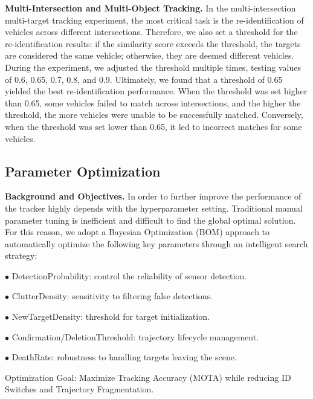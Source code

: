 \documentclass[lettersize,journal]{IEEEtran}
\begin{document}
\textbf{Multi-Intersection and Multi-Object Tracking.}
In the multi-intersection multi-target tracking experiment, the most critical task is the re-identification of vehicles across different intersections. 
Therefore, we also set a threshold for the re-identification results: if the similarity score exceeds the threshold, the targets are considered the same vehicle; otherwise, they are deemed different vehicles. 
During the experiment, we adjusted the threshold multiple times, testing values of 0.6, 0.65, 0.7, 0.8, and 0.9. 
Ultimately, we found that a threshold of 0.65 yielded the best re-identification performance. 
When the threshold was set higher than 0.65, some vehicles failed to match across intersections, and the higher the threshold, the more vehicles were unable to be successfully matched. 
Conversely, when the threshold was set lower than 0.65, it led to incorrect matches for some vehicles.

\subsection{Parameter Optimization}

\textbf{Background and Objectives.}
In order to further improve the performance of the tracker highly depends with the hyperparameter setting. 
Traditional manual parameter tuning is inefficient and difficult to find the global optimal solution. 
For this reason, we adopt a Bayesian Optimization (BOM) approach to automatically optimize the following key parameters through an intelligent search strategy:

$\bullet$ DetectionProbability: control the reliability of sensor detection.

$\bullet$ ClutterDensity: sensitivity to filtering false detections.

$\bullet$ NewTargetDensity: threshold for target initialization.

$\bullet$ Confirmation/DeletionThreshold: trajectory lifecycle management.

$\bullet$ DeathRate: robustness to handling targets leaving the scene.

Optimization Goal: Maximize Tracking Accuracy (MOTA) while reducing ID Switches and Trajectory Fragmentation.
\end{document}
